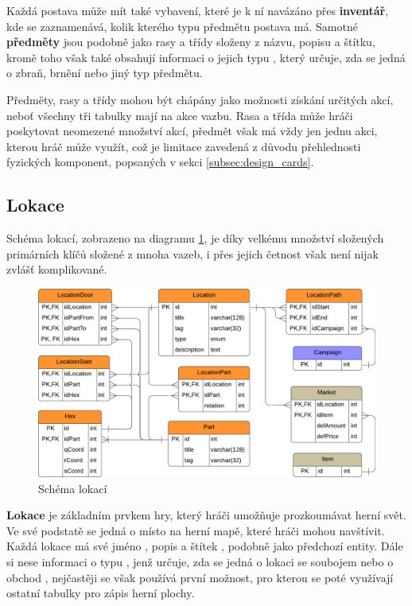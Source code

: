 Každá postava může mít také vybavení, které je k ní navázáno přes \textbf{inventář}, kde se zaznamenává, kolik kterého typu předmětu postava má. Samotné \textbf{předměty} jsou podobně jako rasy a třídy složeny z názvu, popisu a štítku, kromě toho však také obsahují informaci o jejich typu , který určuje, zda se jedná o zbraň, brnění nebo jiný typ předmětu.

Předměty, rasy a třídy mohou být chápány jako možnosti získání určitých akcí, neboť všechny tři tabulky mají na akce vazbu. Rasa a třída může hráči poskytovat neomezené množství akcí, předmět však má vždy jen jednu akci, kterou hráč může využít, což je limitace zavedená z důvodu přehlednosti fyzických komponent, popsaných v sekci \ref{subsec:design_cards}.

\subsection{Lokace}
\label{subsec:schema_location}

Schéma lokací, zobrazeno na diagramu \ref{diag:er_location}, je díky velkému množství složených primárních klíčů složené z mnoha vazeb, i přes jejich četnost však není nijak zvlášť komplikované.

\begin{figure}[h]
    \centering
    \includegraphics{../../shared/diagrams/er_location.pdf}
    \caption{Schéma lokací}
    \label{diag:er_location}
\end{figure}

\textbf{Lokace}  je základním prvkem hry, který hráči umožňuje prozkoumávat herní svět. Ve své podstatě se jedná o místo na herní mapě, které hráči mohou navštívit. Každá lokace má své jméno , popis  a štítek , podobně jako předchozí entity. Dále si nese informaci o typu , jenž určuje, zda se jedná o lokaci se soubojem  nebo o obchod , nejčastěji se však používá první možnost, pro kterou se poté využívají ostatní tabulky pro zápis herní plochy.

